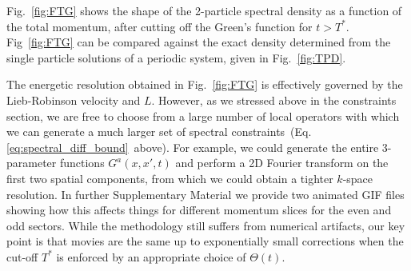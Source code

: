 \documentclass[aps,pra,floatfix,footinbib,longbibliography,twocolumn,superscriptaddress, preprintnumbers, nobibnotes]{revtex4-1}
\begin{document}
Fig.~\ref{fig:FTG} shows the shape of the 2-particle spectral density as a function of the total momentum, after cutting off the Green's function for $t> T^*$. Fig~\ref{fig:FTG} can be compared against the exact density determined from the single particle solutions of a periodic system, given in Fig.~\ref{fig:TPD}.

The energetic resolution obtained in Fig.~\ref{fig:FTG} is effectively governed by the Lieb-Robinson velocity and $L$.  However, as we stressed above in the constraints section, we are free to choose from a large number of local operators with which we can generate a much larger set of spectral constraints~(Eq. \ref{eq:spectral_diff_bound}~above). For example, we could generate the entire 3-parameter functions 
$G^{a}(x,x',t)$ and perform a 2D Fourier transform on the first two spatial components, from which we could obtain a tighter $k$-space resolution. In further Supplementary Material we provide two animated GIF files showing how this affects things for different momentum slices for the even and odd sectors. While the methodology still suffers from numerical artifacts, our key point is that movies are the same up to exponentially small corrections when the cut-off $T^*$ is enforced by an appropriate choice of $\Theta(t)$. 



\end{document}
